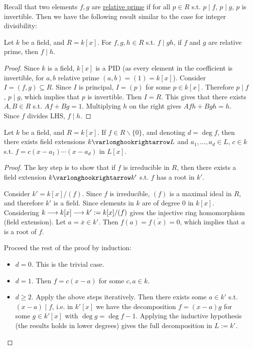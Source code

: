 \textstart
Recall that two elements $f, g$ are \underline{relative prime} if for all $p \in R$ s.t. $p \mid f$, $p \mid g$, $p$ is invertible. Then we have the following result similar to the case for integer divisibility:

\begin{proposition}\label{prop: divisibility for relative prime polynomials}
    Let $k$ be a field, and $R = k[x]$. For $f, g, h \in R$ s.t. $f \mid gh$, if $f$ and $g$ are relative prime, then $f \mid h$.
\end{proposition}

\begin{proof}
    Since $k$ is a field, $k[x]$ is a PID (as every element in the coefficient is invertible, for $a, b$ relative prime $(a, b) = (1) = k[x]$). Consider $I = (f, g) \subseteq R$. Since $I$ is principal, $I = (p)$ for some $p \in k[x]$. Therefore $p \mid f$, $p \mid g$, which implies that $p$ is invertible. Then $I = R$. This gives that there exists $A, B \in R$ s.t. $Af + Bg = 1$. Multiplying $h$ on the right gives $Afh + Bgh = h$. Since $f$ divides LHS, $f \mid h$.
\end{proof}

\begin{proposition}
    Let $k$ be a field, and $R = k[x]$. If $f \in R \smallsetminus \{0\}$, and denoting $d = \deg f$, then there exists field extensions $k \ext L$ and $a_1, \dots, a_d \in L$, $c \in k$ s.t. $f = c(x - a_1)\cdots (x - a_d)$ in $L[x]$.
\end{proposition}

\begin{proof}
    The key step is to show that if $f$ is irreducible in $R$, then there exists a field extension $k \ext k'$ s.t. $f$ has a root in $k'$.

    Consider $k' = k[x]/(f)$. Since $f$ is irreducible, $(f)$ is a maximal ideal in $R$, and therefore $k'$ is a field. Since elements in $k$ are of degree 0 in $k[x]$. Considering $k \longrightarrow k[x] \longrightarrow k' := k[x]/(f)$ gives the injective ring homomorphism (field extension). Let $a = \overline{x} \in k'$. Then $f(a) = \overline{f(x)} = 0$, which implies that $a$ is a root of $f$.

    Proceed the rest of the proof by induction: 
    \begin{itemize}
        \item \emph{$d = 0$.} This is the trivial case.
        \item \emph{$d = 1$.} Then $f = c(x - a)$ for some $c, a \in k$.
        \item \emph{$d \geq 2$.} Apply the above steps iteratively. Then there exists some $a \in k'$ s.t. $(x - a) \mid f$, i.e. in $k'[x]$ we have the decomposition $f = (x - a) g$ for some $g \in k'[x]$ with $\deg g = \deg f - 1$. Applying the inductive hypothesis (the results holds in lower degrees) gives the full decomposition in $L := k'$. 
    \end{itemize}
\end{proof}

